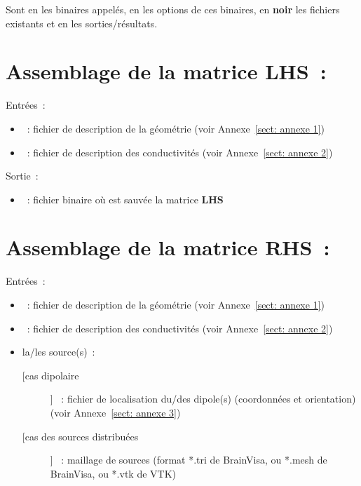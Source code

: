 \noindent
Sont en  les binaires appelés, en  les options de ces binaires, en \textbf{noir}
les fichiers existants et en  les sorties/résultats. 

\section{Assemblage de la matrice $\mathbf{LHS}$~:}
\label{sect: command assemble lhs}

\noindent
Entrées~: 
\begin{itemize}
    \item {}~: fichier de description de la géométrie (voir Annexe~\ref{sect: annexe 1})
    \item {}~: fichier de description des conductivités (voir Annexe~\ref{sect: annexe 2})
\end{itemize}

\noindent
Sortie~:
\begin{itemize}
    \item {}~: fichier binaire où est sauvée la matrice $\mathbf{LHS}$
\end{itemize}

\medskip

\noindent
{}

\section{Assemblage de la matrice $\mathbf{RHS}$~:}
\label{sect: command assemble rhs}

\noindent
Entrées~: 
\begin{itemize}
    \item {}~: fichier de description de la géométrie (voir Annexe~\ref{sect: annexe 1})
    \item {}~: fichier de description des conductivités (voir Annexe~\ref{sect: annexe 2})
    \item la/les source(s)~:
        \begin{description}
            \item [[cas dipolaire]] ~: fichier de localisation du/des dipole(s) (coordonnées et orientation)
                                    (voir Annexe~\ref{sect: annexe 3}) 
            \item [[cas des sources distribuées]]  ~: maillage de sources (format *.tri de BrainVisa, ou *.mesh de BrainVisa, ou *.vtk de VTK) 
        \end{description}
\end{itemize}

